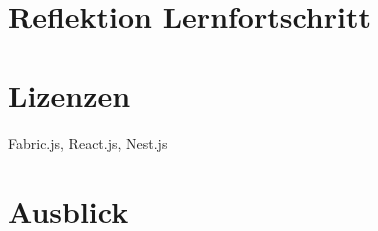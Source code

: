 \section{Reflektion Lernfortschritt}

\section{Lizenzen}

Fabric.js, React.js, Nest.js

\section{Ausblick}
